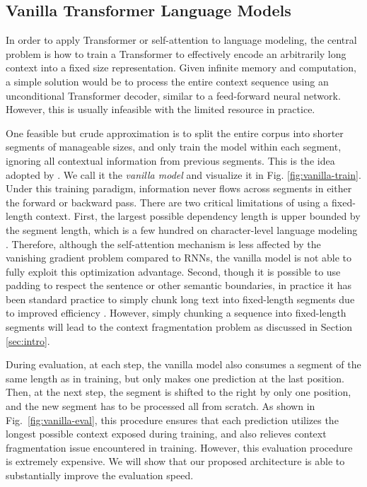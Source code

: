 \subsection{Vanilla Transformer Language Models}
In order to apply Transformer or self-attention to language modeling, the central problem is how to train a Transformer to effectively encode an arbitrarily long context into a fixed size representation.
Given infinite memory and computation, a simple solution would be to process the entire context sequence using an unconditional Transformer decoder, similar to a feed-forward neural network.
However, this is usually infeasible with the limited resource in practice.


One feasible but crude approximation is to split the entire corpus into shorter segments of manageable sizes, and only train the model within each segment, ignoring all contextual information from previous segments.
This is the idea adopted by \citet{al2018character}. We call it the \textit{vanilla model} and visualize it in Fig. \ref{fig:vanilla-train}.
Under this training paradigm, information never flows across segments in either the forward or backward pass.
There are two critical limitations of using a fixed-length context.
First, the largest possible dependency length is upper bounded by the segment length, which is a few hundred on character-level language modeling \citep{al2018character}.
Therefore, although the self-attention mechanism is less affected by the vanishing gradient problem compared to RNNs, the vanilla model is not able to fully exploit this optimization advantage.
Second, though it is possible to use padding to respect the sentence or other semantic boundaries, in practice it has been standard practice to simply chunk long text into fixed-length segments due to improved efficiency \citep{peters2018deep,devlin2018bert,al2018character}. However, simply chunking a sequence into fixed-length segments will lead to the context fragmentation problem as discussed in Section \ref{sec:intro}.

During evaluation, at each step, the vanilla model also consumes a segment of the same length as in training, but only makes one prediction at the last position.
Then, at the next step, the segment is shifted to the right by only one position, and the new segment has to be processed all from scratch.
As shown in Fig.~\ref{fig:vanilla-eval}, this procedure ensures that each prediction utilizes the longest possible context exposed during training, and also relieves context fragmentation issue encountered in training. However, this evaluation procedure is extremely expensive. We will show that our proposed architecture is able to substantially improve the evaluation speed.

